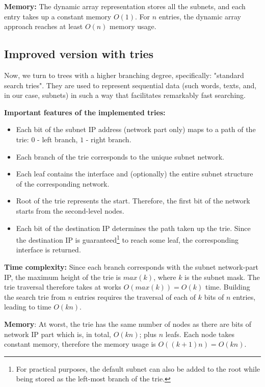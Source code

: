 \documentclass{lpm/adsrprt}
\begin{document}
\textbf{Memory:} The dynamic array representation stores all the subnets, and each entry takes up a constant memory $O(1)$. For $n$ entries, the dynamic array approach reaches at least $O(n)$ memory usage.
 

\subsection{Improved version with tries}
Now, we turn to trees with a higher branching degree, specifically: "standard search tries". They are used to represent sequential data (such words, texts, and, in our case, subnets) in such a way that facilitates remarkably fast searching.

\textbf{Important features of the implemented tries:}

\begin{itemize}
    \item \> Each bit of the subnet IP address (network part only) maps to a path of the trie: $0$ - left branch, $1$ - right branch.
    \item \> Each branch of the trie corresponds to the unique subnet network.
    \item \> Each leaf contains the interface and (optionally) the entire subnet structure of the corresponding network.
    \item \> Root of the trie represents the start. Therefore, the first bit of the network starts from the second-level nodes.
    \item \> Each bit of the destination IP determines the path taken up the trie. Since the destination IP is guaranteed\footnote{For practical purposes, the default subnet can also be added to the root while being stored as the left-most branch of the trie.} to reach some leaf, the corresponding interface is returned.
\end{itemize}

\textbf{Time complexity:}
Since each branch corresponds with the subnet network-part IP, the maximum height of the trie is $max(k)$, where $k$ is the subnet mask. The trie traversal therefore takes at works $O(max(k)) = O(k)$ time. Building the search trie from $n$ entries requires the traversal of each of $k$ bits of $n$ entries, leading to time $O(kn)$. 

\textbf{Memory}: 
At worst, the trie has the same number of nodes as there are bits of network IP part which is, in total, $O(kn)$; plus $n$ leafs. Each node takes constant memory, therefore the memory usage is $O((k+1)n) = O(kn)$.
\end{document}
